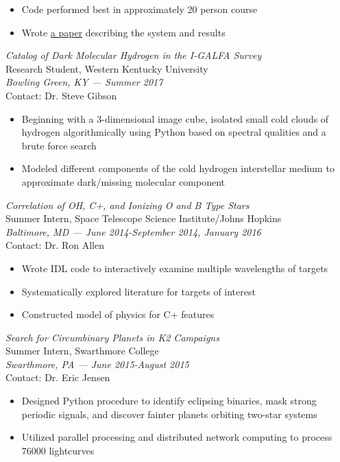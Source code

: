 \documentclass[line,margin]{res}
\begin{document}
\begin{resume}
\begin{itemize}
  \item Code performed best in approximately 20 person course
  \item Wrote \href{https://github.com/jmbhughes/questionanswer/blob/master/report/report.pdf}{a paper} describing the system and results
  \end{itemize}
  
  {\sl Catalog of Dark Molecular Hydrogen in the I-GALFA Survey} \\
  Research Student, Western Kentucky University \\
  {\it Bowling Green, KY — Summer 2017} \\
  Contact: Dr. Steve Gibson \\
  \begin{itemize}
  \item Beginning with a 3-dimensional image cube, isolated small cold clouds of hydrogen
  algorithmically using Python based on spectral qualities and a brute force search
  \item Modeled different components of the cold hydrogen interstellar medium to approximate
    dark/missing molecular component
  \end{itemize}
    
  {\sl Correlation of OH, C+, and Ionizing O and B Type Stars} \\
  Summer Intern, Space Telescope Science Institute/Johns Hopkins \\
  {\it Baltimore, MD — June 2014-September 2014, January 2016} \\
  Contact: Dr. Ron Allen \\
  \begin{itemize}
  \item Wrote IDL code to interactively examine multiple wavelengths of targets
  \item Systematically explored literature for targets of interest
  \item Constructed model of physics for C+ features
  \end{itemize}

  {\sl Search for Circumbinary Planets in K2 Campaigns}\\
  Summer Intern, Swarthmore College \\
  {\it Swarthmore, PA — June 2015-August 2015} \\
  Contact: Dr. Eric Jensen \\
  \begin{itemize}
  \item Designed Python procedure to identify eclipsing binaries, mask strong periodic signals, and
    discover fainter planets orbiting two-star systems
  \item Utilized parallel processing and distributed network computing to process 76000 lightcurves
  \end{itemize}
  

\end{resume}
\end{document}
